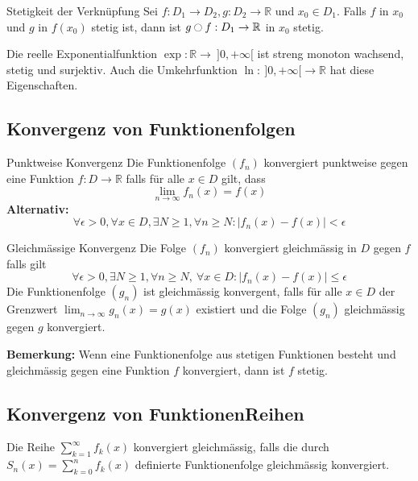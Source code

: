 \documentclass[a4paper,8pt]{extarticle}
\newenvironment{bemerkung}{
   \noindent \textbf{Bemerkung:  }}{}
\def\limn{\lim_{n\to \infty}}
\def\sumk{\sum_{k=1}^\infty}
\def\R{\mathbb{R}}
\begin{document}
\begin{subbox}{Stetigkeit der Verknüpfung}
  Sei $f: D_1 \to D_2, g: D_2 \to \R$ und $x_0 \in D_1$. Falls $f$ in $x_0$ und $g$ in $f(x_0)$ stetig ist, dann ist $g \ocircle f: D_1 \to \R$ in $x_0$ stetig.
 \end{subbox}

\begin{subbox}{Die reelle Exponentialfunktion}
 $\exp: \R \to \ ]0,+\infty[$ ist streng monoton wachsend, stetig und surjektiv. Auch die Umkehrfunktion $\ln: \ ]0,+\infty[ \to \R$ hat diese Eigenschaften.
\end{subbox}

\subsection{Konvergenz von Funktionenfolgen}

\begin{mainbox}{Punktweise Konvergenz}
  Die Funktionenfolge $(f_n)$ konvergiert punktweise gegen eine Funktion $f: D \to \R$ falls für alle $x \in D$ gilt, dass $$\limn f_n(x) = f(x)$$
  \textbf{Alternativ:} $$\forall \epsilon > 0, \forall x \in D, \exists N \geq 1, \forall n \geq N: |f_n(x) - f(x)| < \epsilon$$
\end{mainbox}

\begin{mainbox}{Gleichmässige Konvergenz}
 Die Folge $(f_n)$ konvergiert gleichmässig in $D$ gegen $f$ falls gilt $$\forall \epsilon > 0, \exists N \ge 1, \forall n \ge N, \ \forall x \in D: | f_n(x) - f(x) | \le \epsilon$$
 Die Funktionenfolge $(g_n)$ ist gleichmässig konvergent, falls für alle $x\in D$ der Grenzwert $\limn g_n(x) = g(x)$ existiert und die Folge $(g_n)$ gleichmässig gegen $g$ konvergiert.
\end{mainbox}

\begin{bemerkung}
  Wenn eine Funktionenfolge aus stetigen Funktionen besteht und gleichmässig gegen eine Funktion $f$ konvergiert, dann ist $f$ stetig.
\end{bemerkung}

\subsection{Konvergenz von FunktionenReihen}
\begin{subbox}{}
  Die Reihe $\sumk f_k(x)$ konvergiert gleichmässig, falls die durch $S_n(x) = \sum_{k=0}^n f_k(x)$ definierte Funktionenfolge gleichmässig konvergiert.
\end{subbox}
\end{document}
